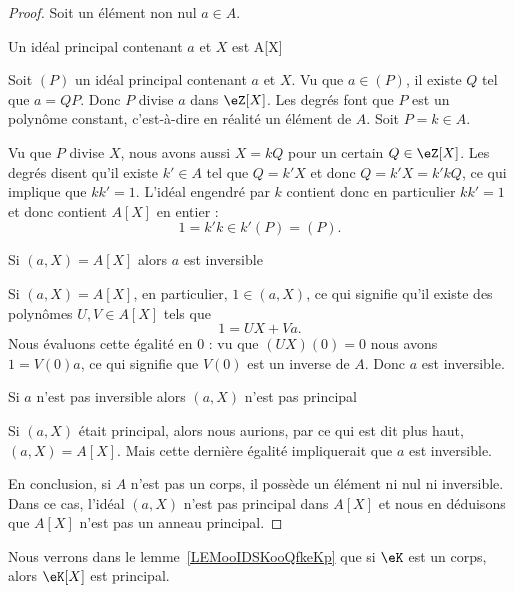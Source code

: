 \begin{proof}
    Soit un élément non nul \( a\in A\).
    \begin{subproof}
        \newcommand{\foo}{A[X]}
    \item[Un idéal principal contenant \( a\) et \( X\) est {A[X]}]

            Soit \( (P)\) un idéal principal contenant \( a\) et \( X\). Vu que \( a\in(P)\), il existe \( Q\) tel que \( a=QP\). Donc \( P\) divise \( a\) dans \( \eZ[X]\). Les degrés font que \( P\) est un polynôme constant, c'est-à-dire en réalité un élément de \( A\). Soit \( P=k\in A\).

            Vu que \( P\) divise \( X\), nous avons aussi \( X=kQ\) pour un certain \( Q\in \eZ[X]\). Les degrés disent qu'il existe \( k'\in A\) tel que \( Q=k'X\) et donc \( Q=k'X=k'kQ\), ce qui implique que \( kk'=1\). L'idéal engendré par \( k\) contient donc en particulier \( kk'=1\) et donc contient \( A[X]\) en entier :
            \begin{equation}
                1=k'k\in k'(P)=(P).
            \end{equation}

        \item[Si \( (a,X)=\foo\) alors \( a\) est inversible]

            Si \( (a,X)=A[X]\), en particulier, \( 1\in (a,X)\), ce qui signifie qu'il existe des polynômes \( U,V\in A[X]\) tels que
            \begin{equation}
                1=UX+Va.
            \end{equation}
            Nous évaluons cette égalité en \( 0\) : vu que \( (UX)(0)=0\) nous avons \( 1=V(0)a\), ce qui signifie que \( V(0)\) est un inverse de \( A\). Donc \( a\) est inversible.


        \item[Si \( a\) n'est pas inversible alors \( (a,X)\) n'est pas principal]

            Si \( (a,X)\) était principal, alors nous aurions, par ce qui est dit plus haut, \( (a,X)=A[X]\). Mais cette dernière égalité impliquerait que \( a\) est inversible.
    \end{subproof}
    En conclusion, si \( A\) n'est pas un corps, il possède un élément ni nul ni inversible. Dans ce cas, l'idéal \( (a,X)\) n'est pas principal dans \( A[X]\) et nous en déduisons que \( A[X]\) n'est pas un anneau principal.
\end{proof}

Nous verrons dans le lemme~\ref{LEMooIDSKooQfkeKp} que si $\eK$ est un corps, alors \( \eK[X]\) est principal.

